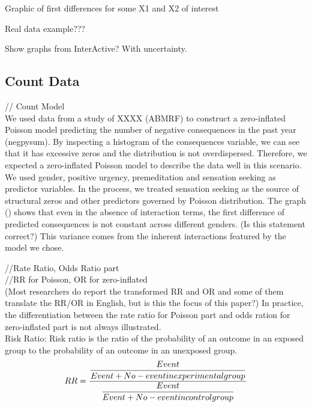 \documentclass[jou, apacite]{apa6}
\begin{document}
Graphic of first differences for some X1 and X2 of interest	

Real data example???

Show graphs from InterActive? With uncertainty.


\subsection{Count Data}
// Count Model \\
We used data from a study of XXXX (ABMRF) to construct a zero-inflated Poisson model predicting the number of negative consequences in the past year (negpysum). By inspecting a histogram of the consequences variable, we can see that it has excessive zeros and the distribution is not overdispersed.  Therefore, we expected a zero-inflated Poisson model to describe the data well in this scenario. We used gender, positive urgency, premeditation and sensation seeking as predictor variables. In the process, we treated sensation seeking as the source of structural zeros and other predictors governed by Poisson distribution. The graph () shows that even in the absence of interaction terms, the first difference of predicted consequences is not constant across different genders. (Is this statement correct?) This variance comes from the inherent interactions featured by the model we chose.



//Rate Ratio, Odds Ratio part \\
//RR for Poisson, OR for zero-inflated \\
(Most researchers do report the transformed RR and OR and some of them translate the RR/OR in English, but is this the focus of this paper?)
In practice, the differentiation between the rate ratio for Poisson part and odds ration for zero-inflated part is not always illustrated. \\

Risk Ratio: Risk ratio is the ratio of the probability of an outcome in an exposed group to the probability of an outcome in an unexposed group.\\
\begin{equation}
RR = \dfrac{\dfrac{Event}{Event + No-event \\in experimental group}}{\dfrac{Event}{Event + No-event in control group}}
\end{equation}
\end{document}
